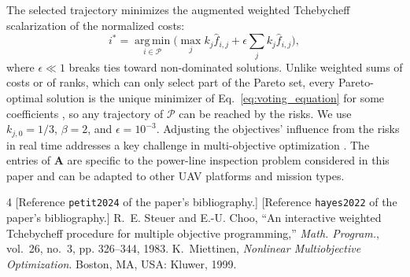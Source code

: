 \documentclass[journal]{IEEEtran}
\begin{document}
The selected trajectory minimizes the augmented weighted Tchebycheff scalarization of the normalized costs:
\begin{equation}
    \label{eq:voting_equation}
    i^{*} = \operatorname*{arg\,min}_{i \in \mathcal{P}} \Big( \max_{j} k_{j} \hat{f}_{i,j} + \epsilon \sum_{j} k_{j} \hat{f}_{i,j} \Big),
\end{equation}
where $\epsilon \ll 1$ breaks ties toward non-dominated solutions. Unlike weighted sums of costs or of ranks, which can only select part of the Pareto set, every Pareto-optimal solution is the unique minimizer of Eq.~\ref{eq:voting_equation} for some coefficients \cite{steuer1983, miettinen1999}, so any trajectory of $\mathcal{P}$ can be reached by the risks. We use $k_{j,0} = 1/3$, $\beta = 2$, and $\epsilon = 10^{-3}$. Adjusting the objectives' influence from the risks in real time addresses a key challenge in multi-objective optimization \cite{hayes2022}. The entries of $\mathbf{A}$ are specific to the power-line inspection problem considered in this paper and can be adapted to other UAV platforms and mission types.

\begin{thebibliography}{4}
 [Reference \texttt{petit2024} of the paper's bibliography.]
 [Reference \texttt{hayes2022} of the paper's bibliography.]
 R.~E. Steuer and E.-U. Choo, ``An interactive weighted Tchebycheff procedure for multiple objective programming,'' \emph{Math. Program.}, vol.~26, no.~3, pp. 326--344, 1983.
 K.~Miettinen, \emph{Nonlinear Multiobjective Optimization}. Boston, MA, USA: Kluwer, 1999.
\end{thebibliography}
\end{document}
